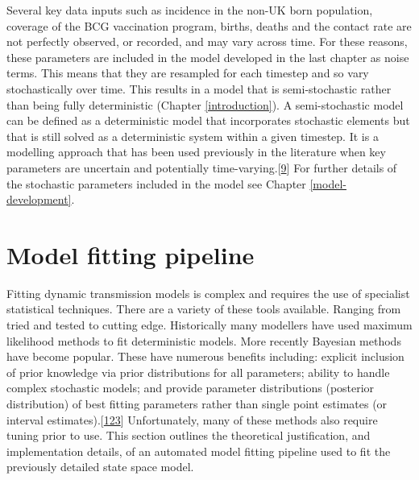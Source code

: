 \documentclass[11pt,twoside]{bristolthesis}
\begin{document}
  Several key data inputs such as incidence in the non-UK born population, coverage of the BCG vaccination program, births, deaths and the contact rate are not perfectly observed, or recorded, and may vary across time. For these reasons, these parameters are included in the model developed in the last chapter as noise terms. This means that they are resampled for each timestep and so vary stochastically over time. This results in a model that is semi-stochastic rather than being fully deterministic (Chapter \ref{introduction}). A semi-stochastic model can be defined as a deterministic model that incorporates stochastic elements but that is still solved as a deterministic system within a given timestep. It is a modelling approach that has been used previously in the literature when key parameters are uncertain and potentially time-varying.{[}\protect\hyperlink{ref-Funk2016a}{9}{]} For further details of the stochastic parameters included in the model see Chapter \ref{model-development}.
  
  \hypertarget{fitting-pipeline}{%
  \section{Model fitting pipeline}\label{fitting-pipeline}}
  
  Fitting dynamic transmission models is complex and requires the use of specialist statistical techniques. There are a variety of these tools available. Ranging from tried and tested to cutting edge. Historically many modellers have used maximum likelihood methods to fit deterministic models. More recently Bayesian methods have become popular. These have numerous benefits including: explicit inclusion of prior knowledge via prior distributions for all parameters; ability to handle complex stochastic models; and provide parameter distributions (posterior distribution) of best fitting parameters rather than single point estimates (or interval estimates).{[}\protect\hyperlink{ref-Murray2015}{123}{]} Unfortunately, many of these methods also require tuning prior to use. This section outlines the theoretical justification, and implementation details, of an automated model fitting pipeline used to fit the previously detailed state space model.
  
\end{document}
